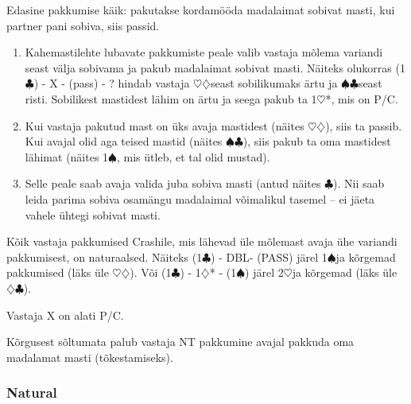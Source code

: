 \documentclass[10pt]{article}
\renewcommand{\c}{$\clubsuit$}
\renewcommand{\d}{$\diamondsuit$}
\newcommand{\h}{$\heartsuit$}
\newcommand{\s}{$\spadesuit$}
\newcommand{\x}{DBL}
\begin{document}
Edasine pakkumise käik: pakutakse kordamööda madalaimat sobivat masti, kui partner pani sobiva, siis passid.
\begin{enumerate}
\item Kahemastilehte lubavate pakkumiste peale valib vastaja mõlema variandi seast välja sobivama ja pakub madalaimat sobivat masti. Näiteks olukorras (1\c) - X - (pass) - ? hindab vastaja \h\d seast sobilikumaks ärtu ja \s\c seast risti. Sobilikest mastidest lähim on ärtu ja seega pakub ta 1\h*, mis on P/C.
\item  Kui vastaja pakutud mast on üks avaja mastidest (näites \h\d), siis ta passib. Kui avajal olid aga teised mastid (näites \s\c), siis pakub ta oma mastidest lähimat (näites 1\s, mis ütleb, et tal olid mustad).
\item  Selle peale saab avaja valida juba sobiva masti (antud näites \c). Nii saab leida parima sobiva osamängu madalaimal võimalikul tasemel – ei jäeta vahele ühtegi sobivat masti.
\end{enumerate}
Kõik vastaja pakkumised Crashile, mis lähevad üle mõlemast avaja ühe variandi pakkumisest, on naturaalsed. Näiteks (1\c) - \x - (PASS) järel 1\s ja kõrgemad pakkumised (läks üle \h\d). Või (1\c) - 1\d* - (1\s) järel 2\h ja kõrgemad (läks üle \d\c).

Vastaja X on alati P/C.

Kõrgusest sõltumata palub vastaja NT pakkumine avajal pakkuda oma madalamat masti (tõkestamiseks).

\subsubsection{Natural}
\end{document}
